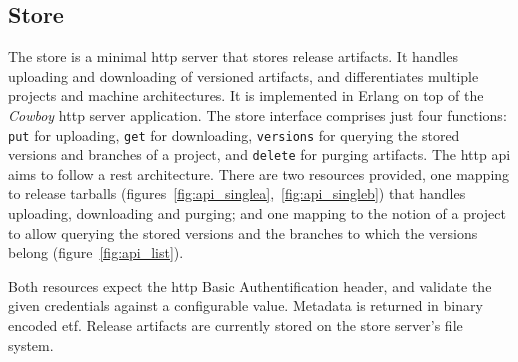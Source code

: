 {\cleardoublepage
\subsection{Store}

The store is a minimal \acrshort{http} server that stores release artifacts. It handles uploading and downloading of versioned artifacts, and differentiates multiple projects and machine architectures. It is implemented in Erlang on top of the \emph{Cowboy} \acrshort{http} server application. The store interface comprises just four functions: \lstinline|put| for uploading, \lstinline|get| for downloading, \lstinline|versions| for querying the stored versions and branches of a project, and \lstinline|delete| for purging artifacts. The \acrshort{http} \acrfull{api} aims to follow a \acrfull{rest} architecture. There are two resources provided, one mapping to release tarballs (figures~\ref{fig:api_singlea},~\ref{fig:api_singleb}) that handles uploading, downloading and purging; and one mapping to the notion of a project to allow querying the stored versions and the branches to which the versions belong (figure~\ref{fig:api_list}).

Both resources expect the \acrshort{http} Basic Authentification header, and validate the given credentials against a configurable value. Metadata is returned in binary encoded \acrfull{etf}. Release artifacts are currently stored on the store server's file system.

}
